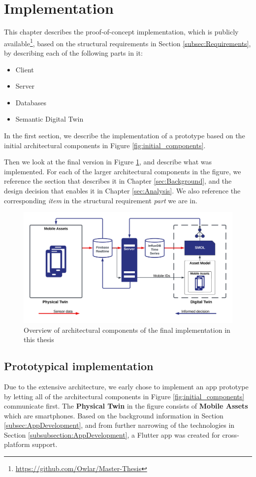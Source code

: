 \documentclass{article}
\begin{document}
\section{Implementation}\label{sec:Implementation}
This chapter describes the proof-of-concept implementation, which is publicly available\footnote{\url{https://github.com/Owlar/Master-Thesis}}, based on the structural requirements in Section \ref{subsec:Requirements}, by describing each of the following parts in it:
\begin{itemize}
    \item Client
    \item Server
    \item Databases
    \item Semantic Digital Twin
\end{itemize}
In the first section, we describe the implementation of a prototype based on the initial architectural components in Figure \ref{fig:initial_components}. 

Then we look at the final version in Figure \ref{fig:components}, and describe what was implemented. For each of the larger architectural components in the figure, we reference the section that describes it in Chapter \ref{sec:Background}, and the design decision that enables it in Chapter \ref{sec:Analysis}. We also reference the corresponding \emph{item} in the structural requirement \emph{part} we are in.

\begin{figure}[H]
    \centering
    \includegraphics[scale=0.14]{graphics/thesis_overview.png}
    \caption{Overview of architectural components of the final implementation in this thesis}
    \label{fig:components}
\end{figure}

\subsection{Prototypical implementation}\label{subsec:Prototypical}
Due to the extensive architecture, we early chose to implement an app prototype by letting all of the architectural components in Figure \ref{fig:initial_components} communicate first. The \textbf{Physical Twin} in the figure consists of \textbf{Mobile Assets} which are smartphones. Based on the background information in Section \ref{subsec:AppDevelopment}, and from further narrowing of the technologies in Section \ref{subsubsection:AppDevelopment}, a Flutter app was created for cross-platform support.
\end{document}
